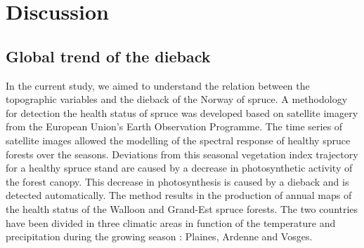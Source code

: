 \documentclass[3p,procedia]{elsarticle}
\begin{document}
  

 
  

\section{Discussion}

\subsection{Global trend of the dieback}

In the current study, we aimed to understand the relation between the topographic variables and the dieback of the Norway of spruce.
A methodology for detection the health status of spruce was developed based on satellite imagery from the European Union's Earth Observation Programme. The time series of satellite images allowed the modelling of the spectral response of healthy spruce forests over the seasons. 
Deviations from this seasonal vegetation index trajectory for a healthy spruce stand are caused by a decrease in photosynthetic activity of the forest canopy.
This decrease in photosynthesis is caused by a dieback and is detected automatically.
The method results in the production of annual maps of the health status of the Walloon and Grand-Est spruce forests.
The two countries have been divided in three climatic areas in function of the temperature and precipitation during the growing season : Plaines, Ardenne and Vosges.
\end{document}
